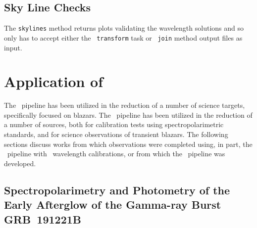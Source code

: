 \subsection{Sky Line Checks} \label{subsec:test_sky}

The \texttt{skylines} method returns plots validating the wavelength solutions and so only has to accept either the \iraf\ \texttt{transform} task or \stops\ \texttt{join} method output files as input.




\section[Application of \textsc{stops}]{Application of \stops} \label{sec:app_stops}

The \stops\ pipeline has been utilized in the reduction of a number of science targets, specifically focused on blazars.
The \stops\ pipeline has been utilized in the reduction of a number of sources, both for calibration tests using spectropolarimetric standards, and for science observations of transient blazars.
The following sections discuss works from which observations were completed using, in part, the \stops\ pipeline with \iraf\ wavelength calibrations, or from which the \stops\ pipeline was developed.



\subsection[Spectropolarimetry and Photometry of the Early Afterglow of the Gamma-ray Burst GRB~191221B]{%
    Spectropolarimetry and Photometry of the Early Afterglow of the Gamma-ray Burst GRB~191221B\\
    \citep{Buckley191221B}
}

